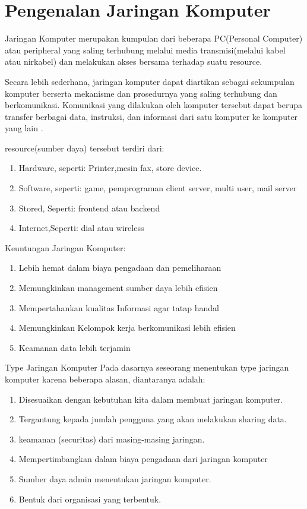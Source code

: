 \section{Pengenalan Jaringan Komputer}
 Jaringan Komputer merupakan kumpulan dari beberapa PC(Personal Computer) atau peripheral yang saling terhubung melalui media transmisi(melalui kabel atau nirkabel) dan melakukan akses bersama  terhadap suatu resource.
 \par Secara lebih sederhana, jaringan komputer dapat diartikan sebagai sekumpulan komputer berserta mekanisme dan prosedurnya yang saling terhubung dan berkomunikasi.  Komunikasi yang dilakukan oleh komputer tersebut dapat berupa transfer berbagai data, instruksi, dan informasi dari satu komputer ke komputer yang lain \cite{irawan2012analisis}.

 resource(sumber daya) tersebut terdiri dari:
 \begin{enumerate}
   \item Hardware, seperti: Printer,mesin fax, store device.
   \item Software, seperti: game, pemprograman client server, multi user, mail server
   \item Stored, Seperti: frontend atau backend
   \item Internet,Seperti: dial atau wireless
 \end{enumerate}

Keuntungan Jaringan Komputer:
\begin{enumerate}
  \item Lebih hemat dalam biaya pengadaan dan pemeliharaan
  \item Memungkinkan management sumber daya lebih efisien
  \item Mempertahankan kualitas Informasi agar tatap handal
  \item Memungkinkan Kelompok kerja berkomunikasi lebih efisien
  \item Keamanan data lebih terjamin
\end{enumerate}

Type Jaringan Komputer
 Pada dasarnya seseorang menentukan type jaringan komputer karena beberapa alasan, diantaranya adalah:
 \begin{enumerate}
   \item Disesuaikan dengan kebutuhan kita dalam membuat jaringan komputer.
   \item Tergantung kepada jumlah pengguna yang akan melakukan sharing data.
   \item keamanan (securitas) dari masing-masing jaringan.
   \item Mempertimbangkan dalam biaya pengadaan dari jaringan komputer
   \item Sumber daya admin menentukan jaringan komputer.
   \item Bentuk dari organisasi yang terbentuk.
 \end{enumerate}

